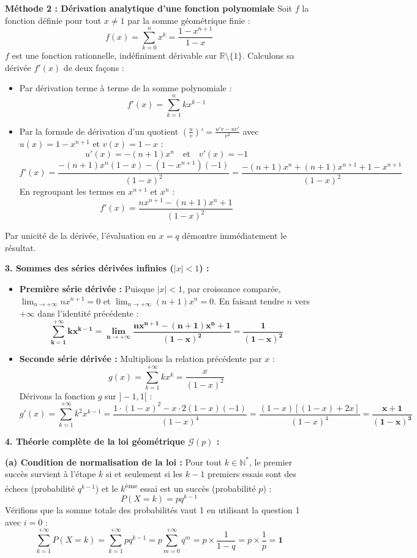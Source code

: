 \documentclass[11pt,a4paper]{article}
\newcommand{\N}{\mathbb{N}}
\newcommand{\R}{\mathbb{R}}
\begin{document}
\begin{correctionbox}
\textbf{Méthode 2 : Dérivation analytique d'une fonction polynomiale}
Soit $f$ la fonction définie pour tout $x \neq 1$ par la somme géométrique finie :
\[
f(x) = \sum_{k=0}^n x^k = \frac{1 - x^{n+1}}{1 - x}
\]
$f$ est une fonction rationnelle, indéfiniment dérivable sur $\R \setminus \{1\}$.
Calculons sa dérivée $f'(x)$ de deux façons :
\begin{itemize}[label=$\bullet$]
    \item Par dérivation terme à terme de la somme polynomiale :
    \[
    f'(x) = \sum_{k=1}^n k x^{k-1}
    \]
    \item Par la formule de dérivation d'un quotient $\left(\frac{u}{v}\right)' = \frac{u'v - uv'}{v^2}$ avec $u(x) = 1 - x^{n+1}$ et $v(x) = 1 - x$ :
    \[
    u'(x) = -(n+1)x^n \quad \text{et} \quad v'(x) = -1
    \]
    \[
    f'(x) = \frac{-(n+1)x^n(1 - x) - (1 - x^{n+1})(-1)}{(1 - x)^2} = \frac{-(n+1)x^n + (n+1)x^{n+1} + 1 - x^{n+1}}{(1 - x)^2}
    \]
    En regroupant les termes en $x^{n+1}$ et $x^n$ :
    \[
    f'(x) = \frac{n x^{n+1} - (n+1) x^n + 1}{(1 - x)^2}
    \]
\end{itemize}
Par unicité de la dérivée, l'évaluation en $x = q$ démontre immédiatement le résultat.

\textbf{3. Sommes des séries dérivées infinies ($|x| < 1$) :}
\begin{itemize}[label=$\bullet$]
    \item \textbf{Première série dérivée :}
    Puisque $|x| < 1$, par croissance comparée, $\lim_{n \to +\infty} n x^{n+1} = 0$ et $\lim_{n \to +\infty} (n+1) x^n = 0$.
    En faisant tendre $n$ vers $+\infty$ dans l'identité précédente :
    \[
    \mathbf{\sum_{k=1}^{+\infty} k x^{k-1} = \lim_{n \to +\infty} \frac{n x^{n+1} - (n+1) x^n + 1}{(1 - x)^2} = \frac{1}{(1 - x)^2}}
    \]
    \item \textbf{Seconde série dérivée :}
    Multiplions la relation précédente par $x$ :
    \[
    g(x) = \sum_{k=1}^{+\infty} k x^k = \frac{x}{(1 - x)^2}
    \]
    Dérivons la fonction $g$ sur $]-1, 1[$ :
    \[
    g'(x) = \sum_{k=1}^{+\infty} k^2 x^{k-1} = \frac{1 \cdot (1 - x)^2 - x \cdot 2(1 - x)(-1)}{(1 - x)^4} = \frac{(1 - x)\left[(1 - x) + 2x\right]}{(1 - x)^4} = \mathbf{\frac{x + 1}{(1 - x)^3}}
    \]
\end{itemize}

\textbf{4. Théorie complète de la loi géométrique $\mathcal{G}(p)$ :}

\textbf{(a) Condition de normalisation de la loi :}
Pour tout $k \in \N^*$, le premier succès survient à l'étape $k$ si et seulement si les $k-1$ premiers essais sont des échecs (probabilité $q^{k-1}$) et le $k$\textsuperscript{ème} essai est un succès (probabilité $p$) :
\[
P(X = k) = p q^{k-1}
\]
Vérifions que la somme totale des probabilités vaut 1 en utilisant la question 1 avec $i = 0$ :
\[
\sum_{k=1}^{+\infty} P(X = k) = \sum_{k=1}^{+\infty} p q^{k-1} = p \sum_{m=0}^{+\infty} q^m = p \times \frac{1}{1 - q} = p \times \frac{1}{p} = \mathbf{1}
\]


\end{correctionbox}
\end{document}
